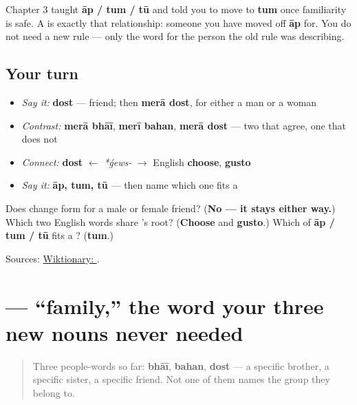 \begin{grammarlens}[title={Grammar Lens: where \ur{تم} (\emph{tum}) actually lives}]
Chapter 3 taught \textbf{āp / tum / tū} and told you to move to \textbf{tum} once familiarity is safe. A \textbf{} is exactly that relationship: someone you have moved off \textbf{āp} for. You do not need a new rule — only the word for the person the old rule was describing.
\end{grammarlens}

\subsection*{Your turn}
\begin{itemize}
\raggedright
  \item \emph{Say it:} \textbf{dost} — friend; then \textbf{merā dost}, for either a man or a woman
  \item \emph{Contrast:} \textbf{merā bhāī}, \textbf{merī bahan}, \textbf{merā dost} — two that agree, one that does not
  \item \emph{Connect:} \textbf{dost} $\leftarrow$ \emph{*ǵews-} $\to$ English \textbf{choose}, \textbf{gusto}
  \item \emph{Say it:} \textbf{āp, tum, tū} — then name which one fits a \textbf{}
\end{itemize}

\begin{tcolorbox}[breakable,colback=teal!4,colframe=teal!35!black,title={Before you move on}]
Does \textbf{} change form for a male or female friend? (\textbf{No — it stays  either way.}) Which two English words share \textbf{}'s root? (\textbf{Choose} and \textbf{gusto}.) Which of \textbf{āp / tum / tū} fits a \textbf{}? (\textbf{tum}.)

Sources: \href{https://en.wiktionary.org/wiki/\%D8\%AF\%D9\%88\%D8\%B3\%D8\%AA}{Wiktionary: }.
\end{tcolorbox}
\section[\texorpdfstring{\ur{خاندان} (khāndān)}{خاندان (khāndān)}]{ — \textquotedblleft{}family,\textquotedblright{} the word your three new nouns never needed}

\label{lesson:UR-C09-khandan}



\begin{quote}
Three people-words so far: \textbf{bhāī}, \textbf{bahan}, \textbf{dost} — a specific brother, a specific sister, a specific friend. Not one of them names the group they belong to.
\end{quote}

